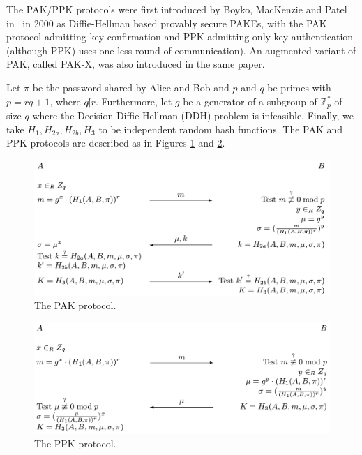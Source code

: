

The PAK/PPK protocols were first introduced by Boyko, MacKenzie and Patel in~\cite{BoMaPa00} in 2000
as Diffie-Hellman based provably secure PAKEs, with the PAK protocol admitting key confirmation
and PPK admitting only key authentication (although PPK) uses one less round of communication). 
An augmented variant of PAK, called PAK-X, was also introduced in the same paper.


Let $\pi$ be the password shared by Alice and Bob and $p$ and $q$ be primes with $p = rq+1$, where $q \not | r$.
Furthermore, let $g$ be a generator of a subgroup of $\mathbb{Z}^\ast_p$ of size $q$ where the Decision
Diffie-Hellman (DDH) problem is infeasible. Finally, we take $H_1, H_{2a}, H_{2b}, H_3$ to be independent random hash 
functions. The PAK and PPK protocols are described as in Figures \ref{fig:pak} and \ref{fig:ppk}. 

\begin{figure}[h]
    \centering
    \includegraphics[scale=0.4]{pak_protocol.png}
    \caption{The PAK protocol.}
    \label{fig:pak}
\end{figure}

\begin{figure}[h]
    \centering
    \includegraphics[scale=0.33]{ppk_protocol.png}
    \caption{The PPK protocol.}
    \label{fig:ppk}
\end{figure}

